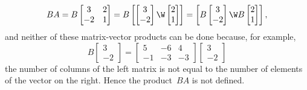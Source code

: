 \begin{example}
\begin{equation*}
BA=B\begin{bmatrix} 3 & 2\\ -2 & 1 \end{bmatrix}
=B\begin{bmatrix} \begin{bmatrix} 3 \\ -2 \end{bmatrix}\W 
\begin{bmatrix} 2 \\ 1 \end{bmatrix} \end{bmatrix}
=\begin{bmatrix} B\begin{bmatrix} 3 \\ -2 \end{bmatrix}\W 
B\begin{bmatrix} 2 \\ 1 \end{bmatrix} \end{bmatrix},
\end{equation*}
and neither of these matrix-vector products can be done because, for example,
\begin{equation*}
B\begin{bmatrix} 3 \\ -2 \end{bmatrix}
=\begin{bmatrix} 5 & -6 & 4\\ -1 & -3 & -3 \end{bmatrix}
\begin{bmatrix} 3 \\ -2 \end{bmatrix}
\end{equation*}
the number of columns of the left matrix is not equal to the number of elements of the vector on the right.
Hence the product~\(BA\) is not defined.
\end{example}




